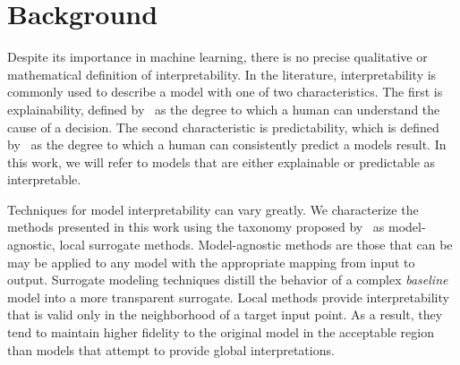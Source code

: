 \documentclass[letterpaper]{article} %
\begin{document}
\section{Background}
Despite its importance in machine learning, there is no precise qualitative or mathematical definition of interpretability.
In the literature, interpretability is commonly used to describe a model with one of two characteristics.
The first is explainability, defined by~\citet{miller2019} as the degree to which a human can understand the cause of a decision.
The second characteristic is predictability, which is defined by~\citet{kim2016} as the degree to which a human can consistently predict a models result.
In this work, we will refer to models that are either explainable or predictable as interpretable.

Techniques for model interpretability can vary greatly.
We characterize the methods presented in this work using the taxonomy proposed by~\citet{adadi2018} as model-agnostic, local surrogate methods.
Model-agnostic methods are those that can be may be applied to any model with the appropriate mapping from input to output.
Surrogate modeling techniques distill the behavior of a complex \emph{baseline} model into a more transparent surrogate.
Local methods provide interpretability that is valid only in the neighborhood of a target input point.
As a result, they tend to maintain higher fidelity to the original model in the acceptable region than models that attempt to provide global interpretations.
\end{document}
